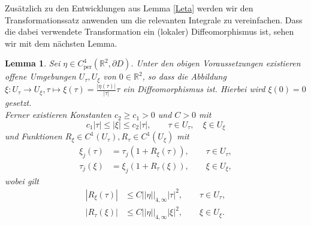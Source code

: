 \documentclass[12pt,a4paper]{scrartcl}
\newtheorem{Lemma}[Satz]{Lemma}
\numberwithin{equation}{section}
\newcommand{\R}{\mathbb{R}} %
\newcommand{\per}{\operatorname{per}}
\begin{document}
Zusätzlich zu den Entwicklungen aus Lemma \ref{Leta} werden wir den Transformationssatz anwenden um die relevanten Integrale zu vereinfachen. Dass die dabei verwendete Transformation ein (lokaler) Diffeomorphismus ist, sehen wir mit dem nächsten Lemma.


\begin{Lemma}\label{Lxi}
Sei $\eta \in  C_{\per}^4 (\R^2, \partial D)$.
Unter den obigen Voraussetzungen existieren offene Umgebungen $U_{\tau},U_{\xi}$ von $0 \in \R^2$, so dass die Abbildung \mbox{$\xi : U_{\tau} \to U_{\xi}, \tau \mapsto \xi(\tau) = \frac{|\eta(\tau)|}{|\tau|}\tau$} ein Diffeomorphismus ist. Hierbei wird $\xi(0) = 0$ gesetzt. \\
Ferner existieren Konstanten $c_2 \geq c_1 >0$ und $C>0$ mit 
\[
c_1|\tau| \leq |\xi| \leq c_2 |\tau|, \qquad \tau \in U_{\tau}, \quad \xi \in U_\xi
\]
und Funktionen $R_\xi \in C^1(U_{\tau}) , R_\tau \in C^1(U_{\xi})$ mit 
\begin{align*}
\xi_j(\tau) &= \tau_j (1+ R_\xi(\tau)), \qquad \tau \in U_{\tau}, \\
\tau_j(\xi) &= \xi_j (1+R_\tau(\xi)), \qquad \xi \in U_{\xi},
\end{align*}
wobei gilt
\begin{align*}
|R_\xi(\tau)| &\leq C ||\eta||_{4,\infty}|\tau|^2,\qquad \tau \in U_{\tau},   \\
|R_\tau(\xi)| &\leq C ||\eta||_{4,\infty} |\xi|^2,\qquad \xi \in U_{\xi}.
\end{align*}
\end{Lemma}
\end{document}
